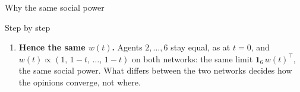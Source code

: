 \documentclass[10pt, aspectratio=169]{beamer}
\begin{document}
\begin{frame}[label=m-fdg-why,t]{Why the same social power}
{\begin{block}{Step by step}
\begin{enumerate}
            and receives $b$ from the others, which still listen to it with total weight
            $1$ ($b$: the social power of each of agents $2, \dots, 6$):
            $w_1 = t\, w_1 + b$, i.e.\ $b = (1-t)\, w_1$. Agent~$1$ counts $1/(1-t)$
            times more and listens to the others $1 - t$ times less: the two factors
            cancel, and each agent receives from agent~$1$ the same as at $t = 0$, whether
            agent~$1$ listens to one agent or to two.
      \item \textbf{Hence the same $w(t)$.} Agents $2, \dots, 6$ stay equal, as at
            $t = 0$, and $w(t) \propto (1,\, 1-t,\, \dots,\, 1-t)$ on both networks: the
            same limit $\mathbf{1}_6\, w(t)^\top$, the same social power. What differs
            between the two networks decides how the opinions converge, not where.
    \end{enumerate}
  \end{block}}
\end{frame}
\end{document}
